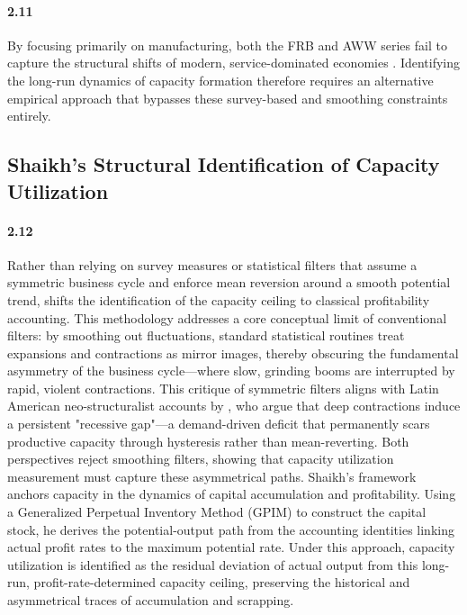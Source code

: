 \paragraph{2.11}
By focusing primarily on manufacturing, both the FRB and AWW series fail to capture the structural shifts of modern, service-dominated economies \citep{Haluska2023}. Identifying the long-run dynamics of capacity formation therefore requires an alternative empirical approach that bypasses these survey-based and smoothing constraints entirely.

\subsection{Shaikh's Structural Identification of Capacity Utilization}
\label{subsec:shaikh_structural_measurement}

\paragraph{2.12}
Rather than relying on survey measures or statistical filters that assume a symmetric business cycle and enforce mean reversion around a smooth potential trend, \citet{Shaikh2016} shifts the identification of the capacity ceiling to classical profitability accounting. This methodology addresses a core conceptual limit of conventional filters: by smoothing out fluctuations, standard statistical routines treat expansions and contractions as mirror images, thereby obscuring the fundamental asymmetry of the business cycle—where slow, grinding booms are interrupted by rapid, violent contractions. This critique of symmetric filters aligns with Latin American neo-structuralist accounts by \citet{FfrenchDavis2010, FfrenchDavis2012}, who argue that deep contractions induce a persistent "recessive gap"—a demand-driven deficit that permanently scars productive capacity through hysteresis rather than mean-reverting. Both perspectives reject smoothing filters, showing that capacity utilization measurement must capture these asymmetrical paths. Shaikh's framework anchors capacity in the dynamics of capital accumulation and profitability. Using a Generalized Perpetual Inventory Method (GPIM) to construct the capital stock, he derives the potential-output path from the accounting identities linking actual profit rates to the maximum potential rate. Under this approach, capacity utilization is identified as the residual deviation of actual output from this long-run, profit-rate-determined capacity ceiling, preserving the historical and asymmetrical traces of accumulation and scrapping.

